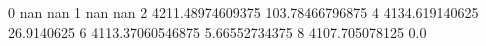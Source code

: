 0 nan nan
1 nan nan
2 4211.48974609375 103.78466796875
4 4134.619140625 26.9140625
6 4113.37060546875 5.66552734375
8 4107.705078125 0.0
